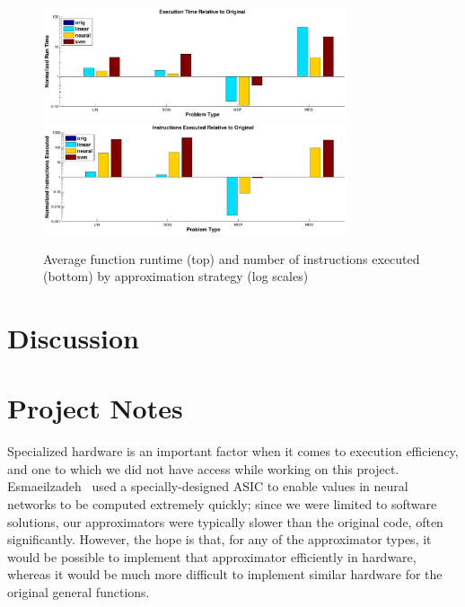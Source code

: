 \documentclass{article}
\begin{document}
\begin{figure}
  \centering
  \includegraphics[width=0.8\textwidth]{images/results_run_time}
  \includegraphics[width=0.8\textwidth]{images/results_instructions}
  \caption{Average function runtime (top) and number of instructions executed (bottom) by approximation strategy (log scales)}
  \label{fig:results_run_time}
\end{figure}

\section{Discussion}



\section{Project Notes}
\label{sec:project_notes}

Specialized hardware is an important factor when it comes to execution efficiency, and one to which we did not have access while working on this project. Esmaeilzadeh~\cite{Esmaeilzadeh12} used a specially-designed ASIC to enable values in neural networks to be computed extremely quickly; since we were limited to software solutions, our approximators were typically slower than the original code, often significantly. However, the hope is that, for any of the approximator types, it would be possible to implement that approximator efficiently in hardware, whereas it would be much more difficult to implement similar hardware for the original general functions.



\end{document}
